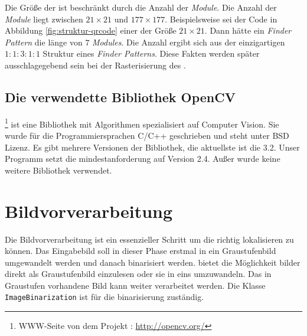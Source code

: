 Die Größe der \QRCodes ist beschränkt durch die Anzahl der \emph{Module}. Die Anzahl der \emph{Module} liegt zwischen $21 \times 21$ und $177 \times 177$. Beispielsweise sei der Code in Abbildung \ref{fig:struktur-qrcode} einer der Größe $21 \times 21$. Dann hätte ein \emph{Finder Pattern} die länge von $7$ \emph{Modules}. Die Anzahl ergibt sich aus der einzigartigen $1:1:3:1:1$ Struktur eines \emph{Finder Patterns}. Diese Fakten werden später ausschlagegebend sein bei der Rasterisierung des \QRCodes.

\section{Die verwendette Bibliothek OpenCV}
\OpenCV\footnote{WWW-Seite von dem Projekt \OpenCV: \url{http://opencv.org/}} ist eine Bibliothek mit Algorithmen spezialisiert auf \glqq Computer Vision\grqq . Sie wurde für die Programmiersprachen C/C++ geschrieben und steht unter BSD Lizenz. Es gibt mehrere Versionen der Bibliothek, die aktuellste ist die 3.2. Unser Programm setzt  die mindestanforderung auf Version 2.4. Außer \OpenCV wurde keine weitere Bibliothek verwendet. 



\chapter{Bildvorverarbeitung}
Die Bildvorverarbeitung ist ein essenzieller Schritt um die \QRCodes richtig lokalisieren zu können. Das Eingabebild soll in dieser Phase erstmal in ein Graustufenbild umgewandelt werden und danach binarisiert werden. \OpenCV bietet die Möglichkeit bilder direkt als Graustufenbild einzulesen oder sie in eins umzuwandeln. Das in Graustufen vorhandene Bild kann weiter verarbeitet werden.
Die Klasse \texttt{ImageBinarization} ist für die binarisierung zuständig. 

